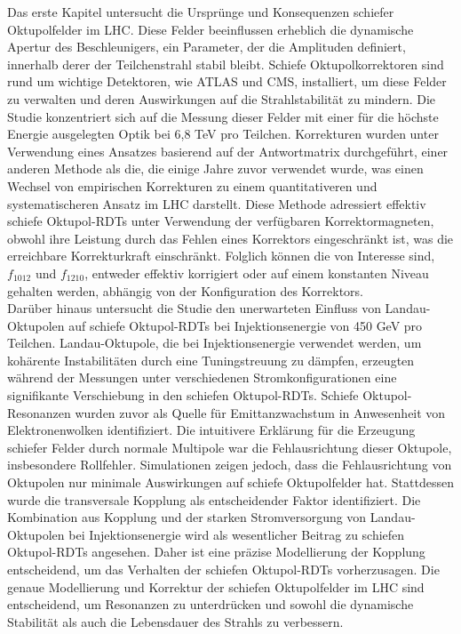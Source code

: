 {%
Das erste Kapitel untersucht die Ursprünge und Konsequenzen schiefer Oktupolfelder im LHC. Diese Felder beeinflussen erheblich die dynamische Apertur des Beschleunigers, ein Parameter, der die Amplituden definiert, innerhalb derer der Teilchenstrahl stabil bleibt. Schiefe Oktupolkorrektoren sind rund um wichtige Detektoren, wie ATLAS und CMS, installiert, um diese Felder zu verwalten und deren Auswirkungen auf die Strahlstabilität zu mindern. Die Studie konzentriert sich auf die Messung dieser Felder mit einer für die höchste Energie ausgelegten Optik bei 6,8 TeV pro Teilchen. Korrekturen wurden unter Verwendung eines Ansatzes basierend auf der Antwortmatrix durchgeführt, einer anderen Methode als die, die einige Jahre zuvor verwendet wurde, was einen Wechsel von empirischen Korrekturen zu einem quantitativeren und systematischeren Ansatz im LHC darstellt. 
Diese Methode adressiert effektiv schiefe Oktupol-RDTs unter Verwendung der verfügbaren Korrektormagneten, obwohl ihre Leistung durch das Fehlen eines Korrektors eingeschränkt ist, was die erreichbare Korrekturkraft einschränkt. Folglich können die von Interesse sind, $f_{1012}$ und $f_{1210}$, entweder effektiv korrigiert oder auf einem konstanten Niveau gehalten werden, abhängig von der Konfiguration des Korrektors.
\\
\indent
Darüber hinaus untersucht die Studie den unerwarteten Einfluss von Landau-Oktupolen auf schiefe Oktupol-RDTs bei Injektionsenergie von 450 GeV pro Teilchen. Landau-Oktupole, die bei Injektionsenergie verwendet werden, um kohärente Instabilitäten durch eine Tuningstreuung zu dämpfen, erzeugten während der Messungen unter verschiedenen Stromkonfigurationen eine signifikante Verschiebung in den schiefen Oktupol-RDTs. Schiefe Oktupol-Resonanzen wurden zuvor als Quelle für Emittanzwachstum in Anwesenheit von Elektronenwolken identifiziert. Die intuitivere Erklärung für die Erzeugung schiefer Felder durch normale Multipole war die Fehlausrichtung dieser Oktupole, insbesondere Rollfehler. Simulationen zeigen jedoch, dass die Fehlausrichtung von Oktupolen nur minimale Auswirkungen auf schiefe Oktupolfelder hat. Stattdessen wurde die transversale Kopplung als entscheidender Faktor identifiziert. Die Kombination aus Kopplung und der starken Stromversorgung von Landau-Oktupolen bei Injektionsenergie wird als wesentlicher Beitrag zu schiefen Oktupol-RDTs angesehen. Daher ist eine präzise Modellierung der Kopplung entscheidend, um das Verhalten der schiefen Oktupol-RDTs vorherzusagen. Die genaue Modellierung und Korrektur der schiefen Oktupolfelder im LHC sind entscheidend, um Resonanzen zu unterdrücken und sowohl die dynamische Stabilität als auch die Lebensdauer des Strahls zu verbessern.

}
